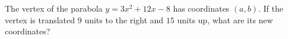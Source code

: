 The vertex of the parabola $y=3x^2+12x-8$ has coordinates $(a,b)$. If the vertex is translated $9$ units to the right and $15$ units up, what are its new coordinates?
